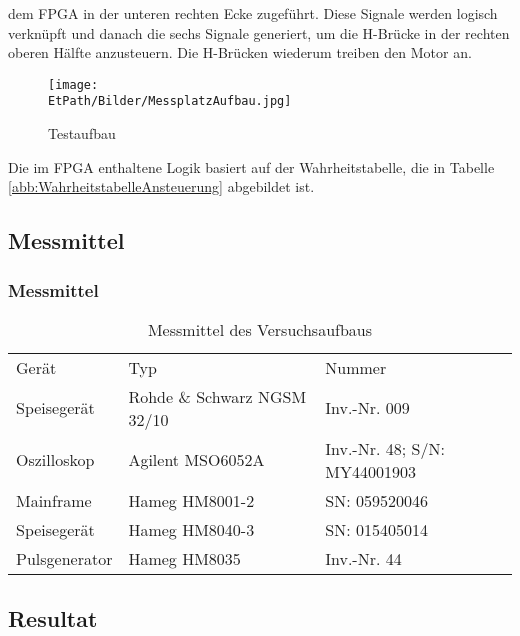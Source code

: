     dem FPGA in der unteren rechten Ecke zugeführt. Diese Signale werden 
    logisch verknüpft und danach die sechs Signale generiert, um die H-Brücke 
    in der rechten oberen Hälfte anzusteuern.  Die H-Brücken wiederum treiben 
    den Motor an.
    \begin{figure}[h!]
       	\texttt{[image: \\EtPath/Bilder/MessplatzAufbau.jpg]}
       	\centering
       	\caption{Testaufbau} 
        \label{abb:MessplatzAufbau}
    \end{figure}
    Die im FPGA enthaltene Logik basiert auf der Wahrheitstabelle, die in 
    Tabelle \ref{abb:WahrheitstabelleAnsteuerung} abgebildet ist.

\ifSTANDALONE
\subsection{Messmittel}
\fi
\ifEMBED
\subsubsection{Messmittel}
\fi
    \begin{table}[h!]
        \centering
        \begin{tabular}{lll}
            \rowcolor{gray}
            Gerät &
                Typ &
                Nummer \\
            Speisegerät & 
                Rohde \& Schwarz NGSM 32/10 &
                Inv.-Nr. 009 \\
            Oszilloskop &
                Agilent MSO6052A &
                Inv.-Nr. 48; S/N: MY44001903 \\
            Mainframe &
                Hameg HM8001-2 &
                SN: 059520046 \\
            Speisegerät &
                Hameg HM8040-3 &
                SN: 015405014 \\
            Pulsgenerator &
                Hameg HM8035 &
                Inv.-Nr. 44 \\
        \end{tabular}
        \caption{Messmittel des Versuchsaufbaus}
    \end{table}

\ifSTANDALONE
\subsection{Resultat}
\label{chap:VersuchsResultat}
\fi
\ifEMBED
